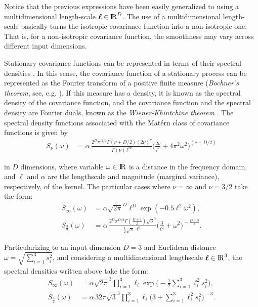 \documentclass[onecolumn,a4paper,11pt]{article}
\begin{document}
\noindent Notice that the previous expressions have been easily generalized to using a multidimensional length-scale $\bm{\ell}\in {\rm I\!R}^D$. The use of a multidimensional length-scale basically turns the isotropic covariance function into a non-isotropic one. That is, for a non-isotropic covariance function, the smoothness may vary across different input dimensions. 

Stationary covariance functions can be represented in terms of their spectral densities \citep{rasmussen2006gaussian}. In this sense, the covariance function of a stationary process can be represented as the Fourier transform of a positive finite measure (\textit{Bochner's theorem}, see, e.g. \cite{akhiezer1993theory}). If this measure has a density, it is known as the spectral density of the covariance function, and the covariance function and the spectral density are Fourier duals, known as the \textit{Wiener-Khintchine theorem} \citep{rasmussen2006gaussian}. The spectral density functions associated with the Mat\'ern class of covariance functions is given by
%
\begin{align*}
S_{\nu}(\omega)&= \alpha \, \frac{2^D\pi^{D/2}\Gamma(\nu+D/2)(2\nu)^{\nu}}{\Gamma(\nu)\, l^{2\nu}}\Big(\frac{2\nu}{l^2}+4\pi^2\omega^2 \Big)^{\!(\nu+D/2)}
\end{align*}

\noindent in $D$ dimensions, where variable $\omega\in {\rm I\!R}$ is a distance in the frequency domain, and $\ell$ and $\alpha$ are the lengthscale and magnitude (marginal variance), respectively, of the kernel. The particular cases where $\nu=\infty$ and $\nu=3/2$ take the form:
%
\begin{align}
S_{\infty}(\omega)&= \alpha \sqrt{2\pi}^D  \ell^D \exp(-0.5 \ell^2 \omega^2), \label{eq_specdens_inf}  \\
S_{\frac{3}{2}}(\omega)&= \alpha \, \frac{2^D\pi^{D/2}\Gamma(\frac{D+3}{2})\sqrt{3}^3}{\frac{1}{2}\sqrt{\pi}\,\ell^3}\Big(\frac{3}{\ell^2}+\omega^2 \Big)^{\!-\frac{D+3}{2}}. \label{eq_specdens_32} 
\end{align}

\noindent Particularizing to an input dimension $D=3$ and Euclidean distance $\omega=\sqrt{\sum_{i=1}^{3}s_i^2}$, and considering a multidimensional lengthscale $\bm{\ell} \in {\rm I\!R}^{3}$, the spectral densities written above take the form:
%
\begin{align*}
S_{\infty}(\omega)&= \alpha \sqrt{2\pi}^{3}  \prod_{i=1}^{3} \ell_i  \exp\!\!\big(\!-\frac{1}{2} \sum_{i=1}^{3} \ell_i^2 s_i^2 \big),   \\
S_{\frac{3}{2}}(\omega)&= \alpha \, 32\pi\sqrt{3}^3\prod_{i=1}^{3}\ell_i\big(3+\sum_{i=1}^{3}\ell_i^2 s_i^2 \big)^{\!-3}.
\end{align*}
\end{document}
